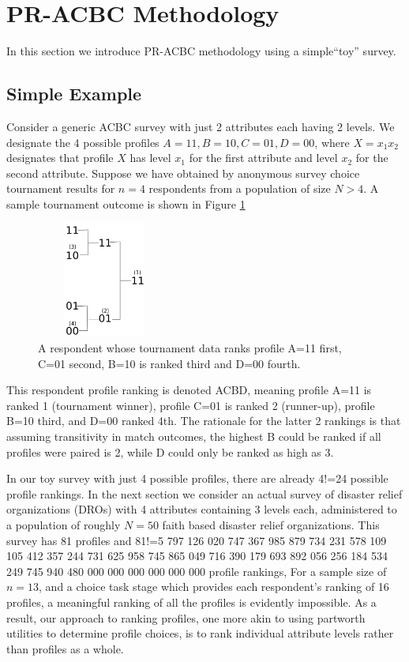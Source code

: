 \documentclass[a4paper, 12pt]{article}
\begin{document}
\section{PR-ACBC Methodology}
In this section we introduce PR-ACBC methodology using a simple``toy'' survey.

\subsection{Simple Example}

Consider a generic ACBC survey with just 2 attributes each having 2 levels. We designate the 4 possible profiles $A=11, B=10, C=01, D=00$, where $X=x_1x_2$ designates that profile $X$ has level $x_1$ for the first attribute and level $x_2$ for the second attribute. Suppose we have obtained by anonymous survey choice tournament results  for $n=4$ respondents from a population of size $N>4$.  A sample tournament outcome is shown in Figure \ref{SimpleTourn}
\begin{figure}[!htpb]
\centering
\includegraphics[width=1.75in, height=1.5in]{SimpleTourn.png}
\caption{A respondent whose tournament data ranks profile A=11 first, C=01 second, B=10 is ranked third and D=00 fourth.  }
\label{SimpleTourn}
\end{figure}

{\flushleft This} respondent profile ranking is denoted ACBD, meaning profile A=11 is ranked 1 (tournament winner), profile C=01 is ranked 2 (runner-up), profile B=10 third, and D=00 ranked 4th. The rationale for the latter 2 rankings is that assuming transitivity in match outcomes, the highest B could be ranked if all profiles were paired is 2, while D could only be ranked as high as 3. 

In our toy survey with just 4 possible profiles, there are already 4!=24 possible profile rankings. In the next section we consider an actual survey of disaster relief organizations (DROs) with 4 attributes containing 3 levels each, administered to a population of roughly $N=50$ faith based disaster relief organizations. This survey  has 81 profiles and 81!=5 797 126 020 747 367 985 879 734 231 578 109 105 412 357 244 731 625 958 745 865 049 716 390
 179 693 892 056 256 184 534 249 745 940 480 000 000 000 000 000 000 profile rankings,  For a sample size of $n=13$, and a choice task stage  which provides each respondent's ranking of 16 profiles, a meaningful ranking of  all the profiles is evidently impossible. As a result, our approach to ranking profiles, one more akin to using partworth utilities to determine profile choices, is to rank individual attribute levels rather than profiles as a whole. 
\end{document}
